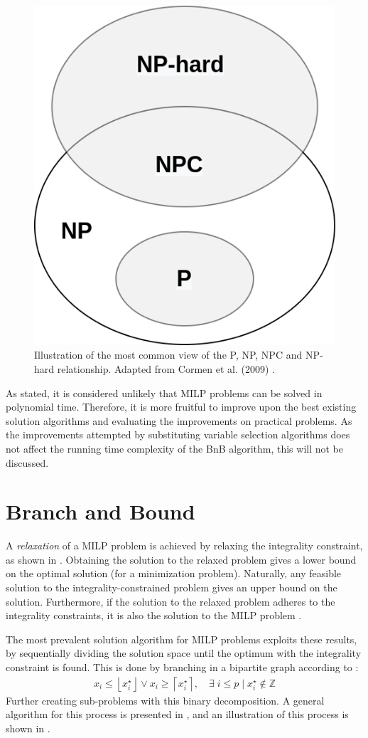 \begin{figure}
    \centering
    \includegraphics[width=0.4\linewidth]{img/npc.png}
    \caption{\label{fig:np}Illustration of the most common view of the P, NP, NPC and NP-hard relationship. Adapted from Cormen et al. (2009) \cite{cormen2009introduction}.}
\end{figure}

As stated, it is considered unlikely that \gls{MILP} problems can be solved in polynomial time. Therefore, it is more fruitful to improve upon the best existing solution algorithms and evaluating the improvements on practical problems. As the improvements attempted by substituting variable selection algorithms does not affect the running time complexity of the \gls{BnB} algorithm, this will not be discussed.  










\section{Branch and Bound}\label{sec:bnb}

A \textit{relaxation} of a \gls{MILP} problem is achieved by relaxing the integrality constraint, as shown in . Obtaining the solution to the relaxed problem gives a lower bound on the optimal solution (for a minimization problem). Naturally, any feasible solution to the integrality-constrained problem gives an upper bound on the solution. Furthermore, if the solution to the relaxed problem adheres to the integrality constraints, it is also the solution to the \gls{MILP} problem \cite{wolsey2020integer}.






The most prevalent solution algorithm for \gls{MILP} problems exploits these results, by sequentially dividing the solution space until the optimum with the integrality constraint is found. This is done by branching in a bipartite graph according to \cite{gasse2019exact}:
\begin{align} \label{eq:branch}
    x_{i} \leq\left\lfloor x_{i}^{\star}\right\rfloor \vee x_{i} \geq\left\lceil x_{i}^{\star}\right\rceil, \quad \exists \; i \leq p \mid x_{i}^{\star} \notin \mathbb{Z}    
\end{align}
Further creating sub-problems with this binary decomposition. A general algorithm for this process is presented in , and an illustration of this process is shown in .

